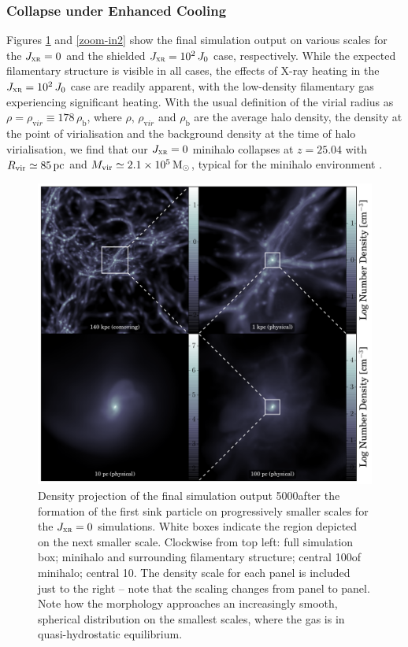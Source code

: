 \documentclass[../thesis.tex]{subfiles}
\begin{document}
\subsubsection{Collapse under Enhanced Cooling}
\label{collapse_acceleration}
Figures \ref{zoom-in} and \ref{zoom-in2} show the final simulation output on various scales for the $J_{\textsc{xr}}=0$ and the shielded $J_{\textsc{xr}} = 10^2\,J_0$ case, respectively.  While the expected filamentary structure is visible in all cases, the effects of X-ray heating in the  $J_{\textsc{xr}} = 10^2\,J_0$ case are readily apparent, with the low-density filamentary gas  
experiencing significant heating. With the usual definition of the virial radius \rvir as $\rho = \rho_{\mathrm vir} \equiv 178\,\rho_{\mathrm b}$, where $\rho$, $\rho_{\mathrm vir}$ and $\rho_{\mathrm b}$ are the average halo density, the density at the point of virialisation and the background density at the time of halo virialisation, we find that our $J_{\textsc{xr}} = 0$ minihalo collapses at $z=25.04$ with ${R}_{\mathrm{vir}} \simeq 85\,\mathrm{pc}$ and ${M}_{\mathrm{vir}} \simeq 2.1\times10^5\,\mathrm{M}_{\odot}$, typical for the minihalo environment \citep{Bromm2013}.  
\begin{figure}
  \begin{center}
    \includegraphics[width=\textwidth]{figures/structure/structure-vanilla_t0}
    \caption{Density projection of the final simulation output 5000\yr after the formation of the first sink particle on progressively smaller scales for the $J_{\textsc{xr}}=0$ simulations.  White boxes indicate the region depicted on the next smaller scale.  Clockwise from top left: full simulation box; minihalo and surrounding filamentary structure; central 100\pc of minihalo; central 10\pc.  The density scale for each panel is included just to the right -- note that the scaling changes from panel to panel. Note how the morphology approaches an increasingly smooth, spherical distribution on the smallest scales, where the gas is in quasi-hydrostatic equilibrium.}
    \label{zoom-in}
  \end{center}
\end{figure}
\end{document}
